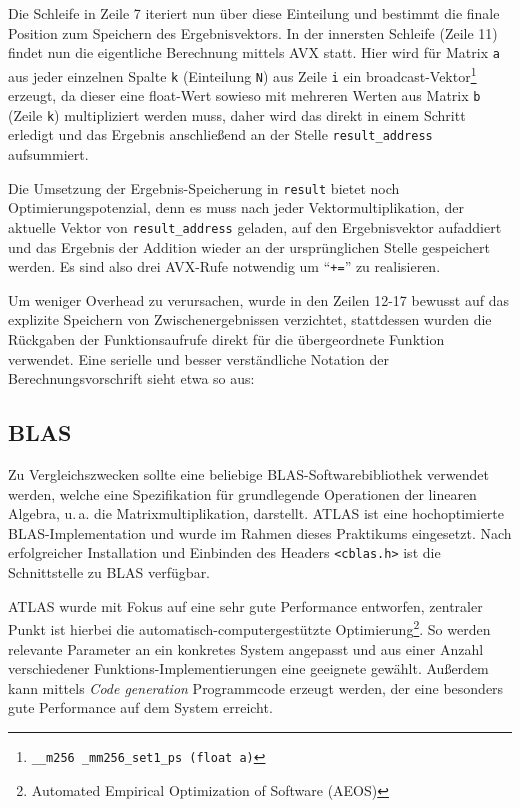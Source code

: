 \documentclass[a4paper,11pt]{scrartcl}
\newcommand{\ua}{\mbox{u.\,a.}\xspace}
\begin{document}
Die Schleife in Zeile 7 iteriert nun über diese Einteilung und bestimmt die finale Position zum 
Speichern des Ergebnisvektors. In der innersten Schleife (Zeile 11) findet nun die eigentliche
Berechnung mittels AVX statt. Hier wird für Matrix \texttt{a} aus jeder einzelnen Spalte
\texttt{k} (Einteilung \texttt{N})
aus Zeile \texttt{i} ein broadcast-Vektor\footnote{\texttt{\_\_m256 \_mm256\_set1\_ps (float a)}}
erzeugt, da dieser eine float-Wert sowieso mit mehreren Werten aus Matrix \texttt{b} 
(Zeile \texttt{k}) multipliziert werden muss, daher wird das direkt in einem Schritt erledigt
und das Ergebnis anschließend an der Stelle \texttt{result\_address} aufsummiert.\newline

Die Umsetzung der Ergebnis-Speicherung in \texttt{result} bietet noch Optimierungspotenzial,
denn es muss nach jeder Vektormultiplikation, der aktuelle Vektor von \texttt{result\_address}
geladen, auf den Ergebnisvektor aufaddiert und das Ergebnis der Addition wieder an der
ursprünglichen Stelle gespeichert werden. Es sind also drei AVX-Rufe notwendig um 
"`\texttt{+=}"' zu realisieren. \newline

Um weniger Overhead zu verursachen, wurde in den Zeilen 12-17 bewusst auf das explizite Speichern von 
Zwischenergebnissen verzichtet, stattdessen wurden die Rückgaben der Funktionsaufrufe direkt
für die übergeordnete Funktion verwendet. Eine serielle und besser verständliche Notation der
Berechnungsvorschrift sieht etwa so aus:\newline




\subsection{BLAS}
Zu Vergleichszwecken sollte eine beliebige BLAS-Softwarebibliothek verwendet werden, welche 
eine Spezifikation für grundlegende Operationen der linearen Algebra, \ua die Matrixmultiplikation, darstellt. ATLAS \cite{atlas} ist eine hochoptimierte BLAS-Implementation und wurde im 
Rahmen dieses Praktikums eingesetzt. Nach erfolgreicher
Installation und Einbinden des Headers \texttt{<cblas.h>} ist die Schnittstelle zu BLAS
verfügbar.\newline

ATLAS wurde mit Fokus auf eine sehr gute Performance entworfen, zentraler Punkt ist hierbei die
automatisch-computergestützte Optimierung\footnote{Automated Empirical Optimization of Software (AEOS)}.
So werden relevante Parameter an ein konkretes System angepasst und aus einer Anzahl verschiedener Funktions-Implementierungen eine geeignete gewählt. Außerdem kann mittels \emph{Code generation}
Programmcode erzeugt werden, der eine besonders gute Performance auf dem System erreicht.\newline
\end{document}
